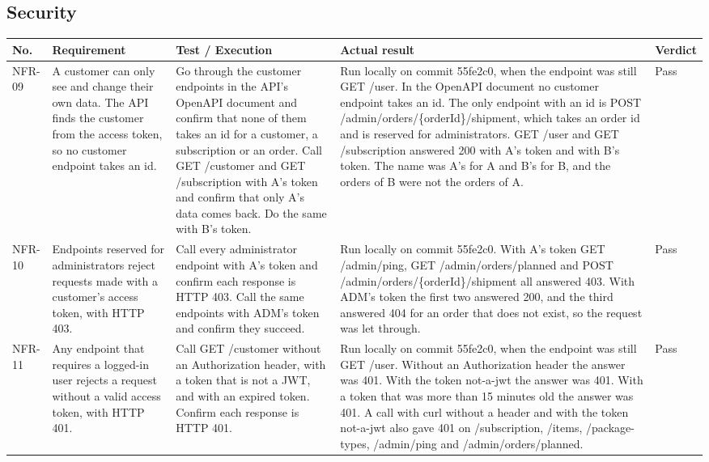 \documentclass[a4paper,11pt]{article}
\begin{document}
\subsection{Security}
\begin{center}
\footnotesize
\begin{tabular}{@{}p{1.2cm}p{3.8cm}p{5.8cm}p{1.7cm}p{1.3cm}@{}}
\hline
\textbf{No.} & \textbf{Requirement} & \textbf{Test / Execution} & \textbf{Actual result} & \textbf{Verdict} \\
\hline
NFR-09 & A customer can only see and change their own data. The API finds the customer from the access token, so no customer endpoint takes an id. & Go through the customer endpoints in the API's OpenAPI document and confirm that none of them takes an id for a customer, a subscription or an order. Call GET /customer and GET /subscription with A's token and confirm that only A's data comes back. Do the same with B's token. & Run locally on commit 55fe2c0, when the endpoint was still GET /user. In the OpenAPI document no customer endpoint takes an id. The only endpoint with an id is POST /admin/orders/\{orderId\}/shipment, which takes an order id and is reserved for administrators. GET /user and GET /subscription answered 200 with A's token and with B's token. The name was A's for A and B's for B, and the orders of B were not the orders of A. & Pass \\
\hline
NFR-10 & Endpoints reserved for administrators reject requests made with a customer's access token, with HTTP 403. & Call every administrator endpoint with A's token and confirm each response is HTTP 403. Call the same endpoints with ADM's token and confirm they succeed. & Run locally on commit 55fe2c0. With A's token GET /admin/ping, GET /admin/orders/planned and POST /admin/orders/\{orderId\}/shipment all answered 403. With ADM's token the first two answered 200, and the third answered 404 for an order that does not exist, so the request was let through. & Pass \\
\hline
NFR-11 & Any endpoint that requires a logged-in user rejects a request without a valid access token, with HTTP 401. & Call GET /customer without an Authorization header, with a token that is not a JWT, and with an expired token. Confirm each response is HTTP 401. & Run locally on commit 55fe2c0, when the endpoint was still GET /user. Without an Authorization header the answer was 401. With the token not-a-jwt the answer was 401. With a token that was more than 15 minutes old the answer was 401. A call with curl without a header and with the token not-a-jwt also gave 401 on /subscription, /items, /package-types, /admin/ping and /admin/orders/planned. & Pass \\
\hline
\end{tabular}
\end{center}
\end{document}
